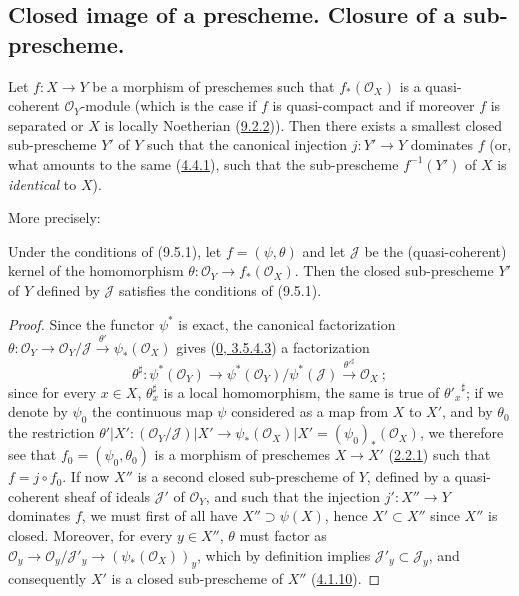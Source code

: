 \subsection{Closed image of a prescheme. Closure of a sub-prescheme.}
\label{subsection:I.9.5}

\begin{proposition}[9.5.1]
\label{I.9.5.1}
Let $f:X\to Y$ be a morphism of preschemes such that $f_*(\mathscr{O}_X)$ is
a quasi-coherent $\mathscr{O}_Y$-module (which is the case if $f$ is
quasi-compact and if moreover $f$ is separated or $X$ is locally Noetherian
(\hyperref[I.9.2.2]{9.2.2})). Then there exists a smallest closed
sub-prescheme $Y'$ of $Y$ such that the canonical injection $j:Y'\to Y$
dominates $f$ (or, what amounts to the same (\hyperref[I.4.4.1]{4.4.1}),
such that the sub-prescheme $f^{-1}(Y')$ of $X$ is \emph{identical} to $X$).
\end{proposition}

More precisely:

\begin{corollary}[9.5.2]
\label{I.9.5.2}
Under the conditions of (9.5.1), let $f=(\psi,\theta)$ and let $\mathscr{J}$
be the (quasi-coherent) kernel of the homomorphism
$\theta:\mathscr{O}_Y\to f_*(\mathscr{O}_X)$. Then the closed sub-prescheme
$Y'$ of $Y$ defined by $\mathscr{J}$ satisfies the conditions of (9.5.1).
\end{corollary}

\begin{proof}
Since the functor $\psi^*$ is exact, the canonical factorization
$\theta:\mathscr{O}_Y\to\mathscr{O}_Y/\mathscr{J}
\xrightarrow{\theta'}\psi_*(\mathscr{O}_X)$ gives
(\hyperref[0.3.5.4.3]{0, 3.5.4.3}) a factorization
\[
  \theta^\sharp:\psi^*(\mathscr{O}_Y)
  \to\psi^*(\mathscr{O}_Y)/\psi^*(\mathscr{J})
  \xrightarrow{{\theta'}^\sharp}\mathscr{O}_X~;
\]
since for every $x\in X$, $\theta_x^\sharp$ is a local homomorphism, the
same is true of ${\theta'_x}^\sharp$; if we denote by $\psi_0$ the
continuous map $\psi$ considered as a map from $X$ to $X'$, and by
$\theta_0$ the restriction
$\theta'|X':(\mathscr{O}_Y/\mathscr{J})|X'
\to\psi_*(\mathscr{O}_X)|X'=(\psi_0)_*(\mathscr{O}_X)$, we therefore see
that $f_0=(\psi_0,\theta_0)$ is a morphism of preschemes $X\to X'$
(\hyperref[I.2.2.1]{2.2.1}) such that $f=j\circ f_0$. If now $X''$
is a second closed sub-prescheme of $Y$, defined by a quasi-coherent sheaf
of ideals $\mathscr{J}'$ of $\mathscr{O}_Y$, and such that the injection
$j':X''\to Y$ dominates $f$, we must first of all have
$X''\supset\psi(X)$, hence $X'\subset X''$ since $X''$ is closed. Moreover,
for every $y\in X''$, $\theta$ must factor as
$\mathscr{O}_y\to\mathscr{O}_y/\mathscr{J}'_y
\to(\psi_*(\mathscr{O}_X))_y$, which by definition implies
$\mathscr{J}'_y\subset\mathscr{J}_y$, and consequently $X'$ is a closed
sub-prescheme of $X''$ (\hyperref[I.4.1.10]{4.1.10}).
\end{proof}


